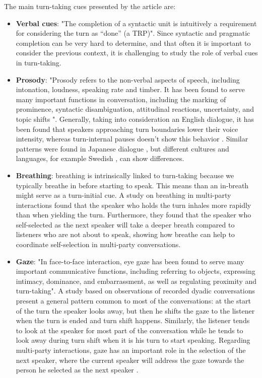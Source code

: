 \documentclass[../main.tex]{subfiles}
\begin{document}
The main turn-taking cues presented by the article are: 
\begin{itemize}
\item \textbf{Verbal cues}: "The completion of a syntactic unit is intuitively a requirement for considering the turn as “done” (a TRP)". Since syntactic and pragmatic completion can be very hard to determine, and that often it is important to consider the previous context, it is challenging to study the role of verbal cues in turn-taking.

\item \textbf{Prosody}: "Prosody refers to the non-verbal aspects
of speech, including intonation, loudness, speaking rate and timber. It has been found to serve many important functions in conversation, including the marking of prominence, syntactic disambiguation, attitudinal reactions, uncertainty, and topic shifts \cite{ward2019prosodic}". Generally, taking into consideration an English dialogue, it has been found that speakers approaching turn boundaries lower their voice intensity, whereas turn-internal pauses doesn't show this behavior \cite{gravano2011turn}. Similar patterns were found in Japanese dialogue \cite{koiso1998analysis}, but different cultures and languages, for example Swedish \cite{edlund2005exploring}, can show differences.

\item \textbf{Breathing}: breathing is intrinsically linked to turn-taking because we typically breathe in before starting to speak. This means than an in-breath might serve as a turn-initial cue. A study on breathing in multi-party interactions \cite{ishii2014analysis} found that the speaker who holds the turn inhales more rapidly than when yielding the turn. Furthermore, they found that the speaker who self-selected as the next speaker will take a deeper breath compared to listeners who are not about to speak, showing how breathe can help to coordinate self-selection in multi-party conversations. 

\item \textbf{Gaze}: "In face-to-face interaction, eye gaze has been found to serve many important communicative functions, including referring to
objects, expressing intimacy, dominance, and embarrassment, as well as regulating proximity and turn-taking". A study based on observations of recorded dyadic conversations \cite{kendon1967some} present a general pattern common to most of the conversations: at the start of the turn the speaker looks away, but then he shifts the gaze to the listener when the turn is ended and turn shift happens. Similarly, the listener tends to look at the speaker for most part of the conversation while he tends to look away during turn shift when it is his turn to start speaking. Regarding multi-party interactions, gaze has an important role in the selection of the next speaker, where the current speaker will address the gaze towards the person he selected as the next speaker \cite{auer2018gaze}.


\end{itemize}
\end{document}

